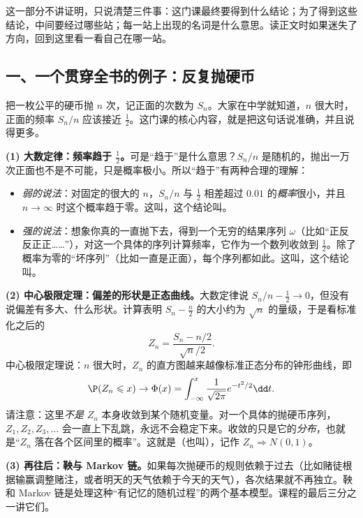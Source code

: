 
这一部分不讲证明，只说清楚三件事：这门课最终要得到什么结论；为了得到这些结论，中间要经过哪些站；每一站上出现的名词是什么意思。读正文时如果迷失了方向，回到这里看一看自己在哪一站。

\subsection*{一、一个贯穿全书的例子：反复抛硬币}

把一枚公平的硬币抛 $n$ 次，记正面的次数为 $S_n$。大家在中学就知道，$n$ 很大时，正面的频率 $S_n/n$ 应该接近 $\frac12$。这门课的核心内容，就是把这句话说准确，并且说得更多。

\textbf{(1) 大数定律：频率趋于 $\frac12$。}可是“趋于”是什么意思？$S_n/n$ 是随机的，抛出一万次正面也不是不可能，只是概率极小。所以“趋于”有两种合理的理解：
\begin{itemize}
\item \emph{弱的说法}：对固定的很大的 $n$，$S_n/n$ 与 $\frac12$ 相差超过 $0.01$ 的\emph{概率}很小，并且 $n\to\infty$ 时这个概率趋于零。这叫，这个结论叫。
\item \emph{强的说法}：想象你真的一直抛下去，得到一个无穷的结果序列 $\omega$（比如“正反反正正……”），对这一个具体的序列计算频率，它作为一个数列收敛到 $\frac12$。除了概率为零的“坏序列”（比如一直是正面），每个序列都如此。这叫，这个结论叫。
\end{itemize}

\textbf{(2) 中心极限定理：偏差的形状是正态曲线。}大数定律说 $S_n/n-\frac12\to0$，但没有说偏差有多大、什么形状。计算表明 $S_n-\frac n2$ 的大小约为 $\sqrt n$ 的量级，于是看标准化之后的
\[
Z_n=\frac{S_n-n/2}{\sqrt n/2}.
\]
中心极限定理说：$n$ 很大时，$Z_n$ 的直方图越来越像标准正态分布的钟形曲线，即
\[
\P(Z_n\leqslant x)\to\Phi(x)=\int_{-\infty}^x\frac1{\sqrt{2\pi}}e^{-t^2/2}\dd t .
\]
请注意：这里\emph{不是} $Z_n$ 本身收敛到某个随机变量。对一个具体的抛硬币序列，$Z_1,Z_2,Z_3,\dots$ 会一直上下乱跳，永远不会稳定下来。收敛的只是它的\emph{分布}，也就是“$Z_n$ 落在各个区间里的概率”。这就是（也叫），记作 $Z_n\Rightarrow N(0,1)$。

\textbf{(3) 再往后：鞅与 Markov 链。}如果每次抛硬币的规则依赖于过去（比如赌徒根据输赢调整赌注，或者明天的天气依赖于今天的天气），各次结果就不再独立。鞅和 Markov 链是处理这种“有记忆的随机过程”的两个基本模型。课程的最后三分之一讲它们。

